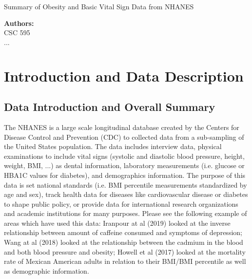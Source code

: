 \documentclass[12pt]{article}
\numberwithin{figure}{section}
\begin{document}
 \begin{center}{\large{\sf Summary of Obesity and Basic Vital Sign Data from NHANES}}\end{center}
\sloppy
\begin{spacing}{1.70}

\begin{center}
{\bf {\sf Authors:}}\\
{\sf CSC 595 \\
...}\\
\end{center}

\end{spacing}

\setcounter{page}{1}

\setcounter{section}{0}

\newpage
{\section{Introduction and Data Description}}
{\subsection{Data Introduction and Overall Summary}}

The NHANES is a large scale longitudinal database created by the Centers for Disease Control and Prevention (CDC) to collected data from a sub-sampling of the United States population.  The data includes interview data, physical examinations to include vital signs (systolic and diastolic blood pressure, height, weight, BMI, ...) as dental information, laboratory measurements (i.e. glucose or HBA1C values for diabetes), and demographics information.  The purpose of this data is set national standards (i.e. BMI percentile measurements standardized by age and sex), track health data for diseases like cardiovascular disease or diabetes to shape public policy, or provide data for international research organizations and academic institutions for many purposes.  Please see the following example of areas which have used this data: Iranpour at al (2019) looked at the inverse relationship between amount of caffeine consumed and symptoms of depression; Wang at al (2018) looked at the relationship between the cadmium in the blood and both blood pressure and obesity; Howell et al (2017) looked at the mortality rate of Mexican American adults in relation to their BMI/BMI percentile as well as demographic information.
\end{document}
